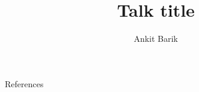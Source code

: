\documentclass[14pt,compress,usenames,dvipsnames,aspectratio=169]{beamer}
\title{\textbf{Talk title}}
\author{Ankit Barik}
\institute[]{%
Johns Hopkins University
}
\date{}
\begin{document}

\begin{frame}[plain]
\titlepage
\end{frame}


\begin{frame}{References}
    
    
\end{frame}
\end{document}
